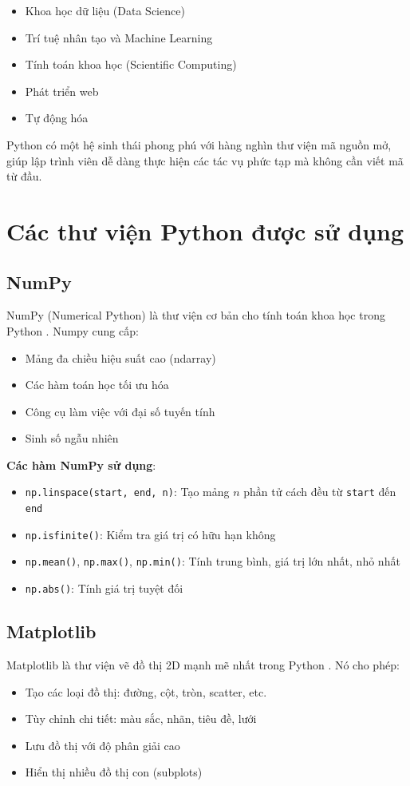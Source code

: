 \documentclass{report}
\begin{document}
\begin{itemize}
    \item Khoa học dữ liệu (Data Science)
    \item Trí tuệ nhân tạo và Machine Learning
    \item Tính toán khoa học (Scientific Computing)
    \item Phát triển web
    \item Tự động hóa
\end{itemize}

Python có một hệ sinh thái phong phú với hàng nghìn thư viện mã nguồn mở, giúp lập trình viên dễ dàng thực hiện các tác vụ phức tạp mà không cần viết mã từ đầu.

\section{Các thư viện Python được sử dụng}

\subsection{NumPy}
\justifying NumPy (Numerical Python) là thư viện cơ bản cho tính toán khoa học trong Python \cite{numpy_docs}. Numpy cung cấp:
\begin{itemize}
    \item Mảng đa chiều hiệu suất cao (ndarray)
    \item Các hàm toán học tối ưu hóa
    \item Công cụ làm việc với đại số tuyến tính
    \item Sinh số ngẫu nhiên
\end{itemize}

\textbf{Các hàm NumPy sử dụng}:
\begin{itemize}
    \item \texttt{np.linspace(start, end, n)}: Tạo mảng $n$ phần tử cách đều từ \texttt{start} đến \texttt{end}
    \item \texttt{np.isfinite()}: Kiểm tra giá trị có hữu hạn không
    \item \texttt{np.mean()}, \texttt{np.max()}, \texttt{np.min()}: Tính trung bình, giá trị lớn nhất, nhỏ nhất
    \item \texttt{np.abs()}: Tính giá trị tuyệt đối
\end{itemize}

\subsection{Matplotlib}
Matplotlib là thư viện vẽ đồ thị 2D mạnh mẽ nhất trong Python \cite{matplotlib_docs}. Nó cho phép:
\begin{itemize}
    \item Tạo các loại đồ thị: đường, cột, tròn, scatter, etc.
    \item Tùy chỉnh chi tiết: màu sắc, nhãn, tiêu đề, lưới
    \item Lưu đồ thị với độ phân giải cao
    \item Hiển thị nhiều đồ thị con (subplots)
\end{itemize}
\end{document}
